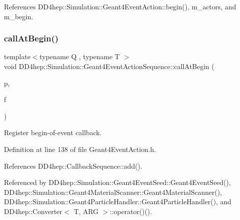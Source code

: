 References D\+D4hep\+::\+Simulation\+::\+Geant4\+Event\+Action\+::begin(), m\+\_\+actors, and m\+\_\+begin.

\hypertarget{class_d_d4hep_1_1_simulation_1_1_geant4_event_action_sequence_a84e628e9ef517fc1c0b16b19a876ba32}{}\label{class_d_d4hep_1_1_simulation_1_1_geant4_event_action_sequence_a84e628e9ef517fc1c0b16b19a876ba32} 
\subsubsection{\texorpdfstring{call\+At\+Begin()}{callAtBegin()}}
{\footnotesize\ttfamily template$<$typename Q , typename T $>$ \\
void D\+D4hep\+::\+Simulation\+::\+Geant4\+Event\+Action\+Sequence\+::call\+At\+Begin (\begin{DoxyParamCaption}\item[{Q $\ast$}]{p,  }\item[{void(T\+::$\ast$)(const G4\+Event $\ast$)}]{f }\end{DoxyParamCaption})\hspace{0.3cm}{\ttfamily [inline]}}



Register begin-\/of-\/event callback. 



Definition at line 138 of file Geant4\+Event\+Action.\+h.



References D\+D4hep\+::\+Callback\+Sequence\+::add().



Referenced by D\+D4hep\+::\+Simulation\+::\+Geant4\+Event\+Seed\+::\+Geant4\+Event\+Seed(), D\+D4hep\+::\+Simulation\+::\+Geant4\+Material\+Scanner\+::\+Geant4\+Material\+Scanner(), D\+D4hep\+::\+Simulation\+::\+Geant4\+Particle\+Handler\+::\+Geant4\+Particle\+Handler(), and D\+D4hep\+::\+Converter$<$ T, A\+R\+G $>$\+::operator()().

\hypertarget{class_d_d4hep_1_1_simulation_1_1_geant4_event_action_sequence_a136505d70b13db82a9339135330bda6a}{}\label{class_d_d4hep_1_1_simulation_1_1_geant4_event_action_sequence_a136505d70b13db82a9339135330bda6a} 
